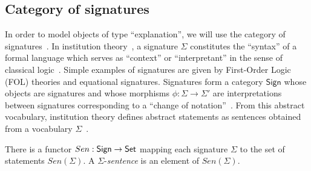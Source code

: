 \subsection{Category of signatures}
In order to model objects of type ``explanation'', we will use the category of signatures~\cite{goguen1992institutions}.
In institution theory~\cite{goguen1992institutions}, a signature $\Sigma$ constitutes the ``syntax'' of a formal language which serves as ``context'' or ``interpretant'' in the sense of classical logic~\cite{goguen2005concept}. Simple examples of signatures are given by First-Order Logic (FOL) theories and equational signatures.
Signatures form a category $\mathsf{Sign}$ whose objects are signatures and whose morphisms $\phi: \Sigma \rightarrow \Sigma'$ are interpretations between signatures corresponding to a ``change of notation''~\cite{goguen1992institutions}.
From this abstract vocabulary, institution theory defines abstract statements as sentences obtained from a vocabulary $\Sigma$~\cite{goguen1992institutions}.
\begin{definition}
There is a functor $Sen: \mathsf{Sign} \rightarrow \mathsf{Set}$ mapping each signature $\Sigma$ to the set of statements $Sen(\Sigma)$.
A $\Sigma$-\emph{sentence} is an element of \(Sen(\Sigma)\).
\end{definition}

